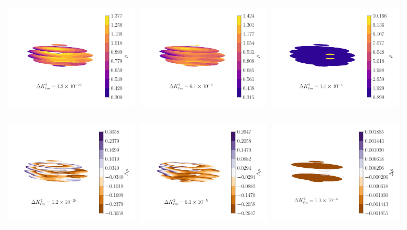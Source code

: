 \documentclass[fleqn,usenatbib]{mnras}
\begin{document}
\begin{figure}
  \centering
  \includegraphics[width=0.3\textwidth]{figs/blob-likelihood.pdf}\hfill
  \includegraphics[width=0.3\textwidth]{figs/blob-harmonic.pdf}\hfill
  \includegraphics[width=0.3\textwidth]{figs/blob-lumpy.pdf}

  \includegraphics[width=0.3\textwidth]{figs/blob-diff-likelihood.pdf}\hfill
  \includegraphics[width=0.3\textwidth]{figs/blob-diff-harmonic.pdf}\hfill
  \includegraphics[width=0.3\textwidth]{figs/blob-diff-lumpy.pdf}


\end{figure}
\end{document}
